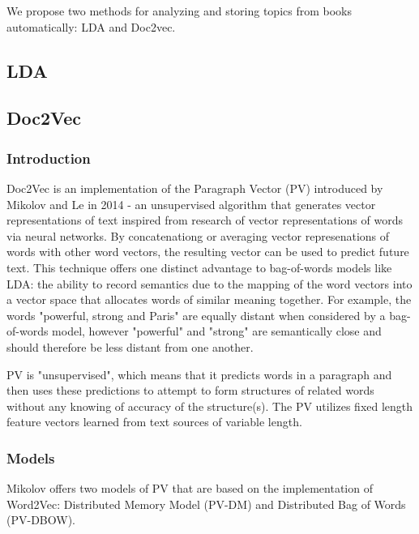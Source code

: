 
We propose two methods for analyzing and storing topics from books automatically: LDA and Doc2vec. 

\subsection{LDA}
\label{sec:lda}


\subsection{Doc2Vec}
\label{sec:doc2vec}

\subsubsection{Introduction}

Doc2Vec is an implementation of the Paragraph Vector (PV) introduced by Mikolov and Le in 2014 - an unsupervised algorithm that generates vector representations of text inspired from research of vector representations of words via neural networks. \cite{RefWorks:doc:5a6e5746e4b0d609eec798d7} By concatenationg or averaging vector represenations of words with other word vectors, the resulting vector can be used to predict future text. This technique offers one distinct advantage to bag-of-words models like LDA: the ability to record semantics due to the mapping of the word vectors into a vector space that allocates words of similar meaning together. For example, the words "powerful, strong and Paris" are equally distant when considered by a bag-of-words model, however "powerful" and "strong" are semantically close and should therefore be less distant from one another. \cite{RefWorks:doc:5a6e5746e4b0d609eec798d7}
	
PV is "unsupervised", which means that it predicts words in a paragraph and then uses these predictions to attempt to form structures of related words without any knowing of accuracy of the structure(s). The PV utilizes fixed length feature vectors learned from text sources of variable length. 


\subsubsection{Models}
Mikolov offers two models of PV that are based on the implementation of Word2Vec: Distributed Memory Model (PV-DM) and Distributed Bag of Words (PV-DBOW). 

